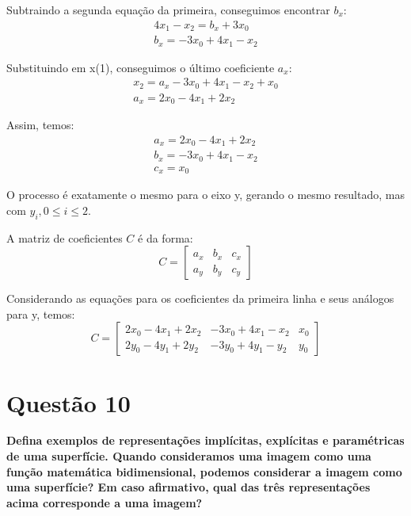 \documentclass[12pt]{article}
\begin{document}
Subtraindo a segunda equação da primeira, conseguimos encontrar $b_x$:
\begin{gather*}
    4x_1-x_2 = b_x + 3x_0\\
    b_x = -3x_0 + 4x_1 - x_2 
\end{gather*}{}

Substituindo em x(1), conseguimos o último coeficiente $a_x$:
\begin{gather*}
    x_2 = a_x -3x_0 + 4x_1 - x_2 + x_0\\
    a_x = 2x_0 - 4x_1 + 2x_2
\end{gather*}{}

Assim, temos:
\begin{gather*}
    a_x = 2x_0 - 4x_1 + 2x_2\\
    b_x = -3x_0 + 4x_1 - x_2 \\
    c_x = x_0    
\end{gather*}{}

O processo é exatamente o mesmo para o eixo y, gerando o mesmo resultado, mas com $y_i, 0\leq i \leq 2$.

A matriz de coeficientes $C$ é da forma:
\begin{equation*}
    C=
    \begin{bmatrix}
    a_x & b_x & c_x \\
    a_y & b_y & c_y
    \end{bmatrix}
\end{equation*}

Considerando as equações para os coeficientes da primeira linha e seus análogos para y, temos:
\begin{equation*}
    C=
    \begin{bmatrix}
    2x_0 - 4x_1 + 2x_2 & -3x_0 + 4x_1 - x_2 & x_0 \\
    2y_0 - 4y_1 + 2y_2 & -3y_0 + 4y_1 - y_2 & y_0 
    \end{bmatrix}
\end{equation*}

\section*{Questão 10}
{\bfseries Defina exemplos de representações implícitas, explícitas e paramétricas de uma superfície. Quando consideramos uma imagem como uma função matemática bidimensional, podemos considerar a imagem como uma superfície? Em caso afirmativo, qual das três representações acima corresponde a uma imagem?}
\end{document}
